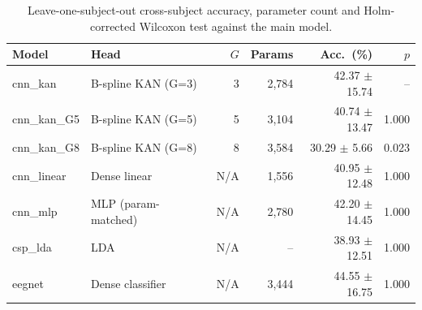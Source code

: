 \begin{table}[htbp]
\centering
\caption{Leave-one-subject-out cross-subject accuracy, parameter count and Holm-corrected Wilcoxon test against the main model.}
\label{tab:loso_benchmark_results}
\begin{tabular}{llrrrr}
\toprule
\textbf{Model} & \textbf{Head} & \textbf{$G$} & \textbf{Params} & \textbf{Acc.\ (\%)} & \textbf{$p$} \\
\midrule
cnn\_kan & B-spline KAN (G=3) & 3 & 2,784 & 42.37 $\pm$ 15.74 & -- \\
cnn\_kan\_G5 & B-spline KAN (G=5) & 5 & 3,104 & 40.74 $\pm$ 13.47 & 1.000 \\
cnn\_kan\_G8 & B-spline KAN (G=8) & 8 & 3,584 & 30.29 $\pm$ 5.66 & 0.023 \\
cnn\_linear & Dense linear & N/A & 1,556 & 40.95 $\pm$ 12.48 & 1.000 \\
cnn\_mlp & MLP (param-matched) & N/A & 2,780 & 42.20 $\pm$ 14.45 & 1.000 \\
csp\_lda & LDA & N/A & -- & 38.93 $\pm$ 12.51 & 1.000 \\
eegnet & Dense classifier & N/A & 3,444 & 44.55 $\pm$ 16.75 & 1.000 \\
\bottomrule
\end{tabular}
\end{table}